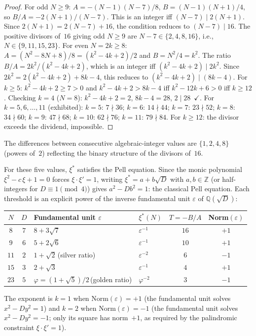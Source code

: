 \begin{proof}
For odd $N \ge 9$: $A = -(N{-}1)(N{-}7)/8$,
$B = (N{-}1)(N{+}1)/4$, so $B/A = -2(N{+}1)/(N{-}7)$.
This is an integer iff $(N{-}7) \mid 2(N{+}1)$.
Since $2(N{+}1) = 2(N{-}7) + 16$, the condition reduces to
$(N{-}7) \mid 16$.  The positive divisors of~$16$ giving odd
$N \ge 9$ are $N{-}7 \in \{2, 4, 8, 16\}$, i.e.,
$N \in \{9, 11, 15, 23\}$.
For even $N = 2k \ge 8$: $A = (N^2{-}8N{+}8)/8 = (k^2{-}4k{+}2)/2$
and $B = N^2/4 = k^2$.
The ratio $B/A = 2k^2/(k^2{-}4k{+}2)$, which is an integer
iff $(k^2{-}4k{+}2) \mid 2k^2$.
Since $2k^2 = 2(k^2{-}4k{+}2) + 8k{-}4$, this reduces to
$(k^2{-}4k{+}2) \mid (8k{-}4)$.
For $k \ge 5$: $k^2 - 4k + 2 \ge 7 > 0$ and
$k^2 - 4k + 2 > 8k - 4$ iff $k^2 - 12k + 6 > 0$ iff $k \ge 12$.
Checking $k = 4$ ($N = 8$): $k^2{-}4k{+}2 = 2$, $8k{-}4 = 28$,
$2 \mid 28$~$\checkmark$.
For $k = 5,6,\ldots,11$ (exhibited):
$k{=}5$: $7 \nmid 36$;
$k{=}6$: $14 \nmid 44$;
$k{=}7$: $23 \nmid 52$;
$k{=}8$: $34 \nmid 60$;
$k{=}9$: $47 \nmid 68$;
$k{=}10$: $62 \nmid 76$;
$k{=}11$: $79 \nmid 84$.
For $k \ge 12$: the divisor exceeds the dividend, impossible.
\end{proof}

The differences between consecutive algebraic-integer values
are $\{1, 2, 4, 8\}$ (powers of~$2$) reflecting the
binary structure of the divisors of~$16$.

For these five values, $\xi^*$ satisfies the Pell equation.
Since the monic polynomial $\xi^2 - c\,\xi + 1 = 0$ forces
$\xi\cdot\xi' = 1$, writing $\xi^* = a + b\sqrt{D}$ with
$a, b \in \mathbb{Z}$ (or half-integers for $D \equiv 1 \pmod{4}$)
gives $a^2 - D b^2 = 1$: the classical Pell equation.
Each threshold is an explicit power of the inverse fundamental
unit $\varepsilon$ of $\mathbb{Q}(\sqrt{D})$:
\begin{center}
\begin{tabular}{ccllcc}
\toprule
$N$ & $D$ & Fundamental unit $\varepsilon$ &
$\xi^*(N)$ & $T = -B/A$ & Norm$(\varepsilon)$ \\
\midrule
$8$  & $7$ & $8 + 3\sqrt{7}$       & $\varepsilon^{-1}$
  & $16$ & $+1$ \\
$9$  & $6$ & $5 + 2\sqrt{6}$       & $\varepsilon^{-1}$
  & $10$ & $+1$ \\
$11$ & $2$ & $1 + \sqrt{2}$\,(silver ratio) & $\varepsilon^{-2}$
  & $6$  & $-1$ \\
$15$ & $3$ & $2 + \sqrt{3}$        & $\varepsilon^{-1}$
  & $4$  & $+1$ \\
$23$ & $5$ & $\varphi = (1{+}\sqrt{5})/2$\,(golden ratio)
  & $\varphi^{-2}$ & $3$  & $-1$ \\
\bottomrule
\end{tabular}
\end{center}
The exponent is $k = 1$ when $\mathrm{Norm}(\varepsilon) = +1$
(the fundamental unit solves $x^2 - Dy^2 = 1$) and $k = 2$ when
$\mathrm{Norm}(\varepsilon) = -1$ (the fundamental unit solves
$x^2 - Dy^2 = -1$; only its square has norm~$+1$, as required
by the palindromic constraint $\xi\cdot\xi' = 1$).

